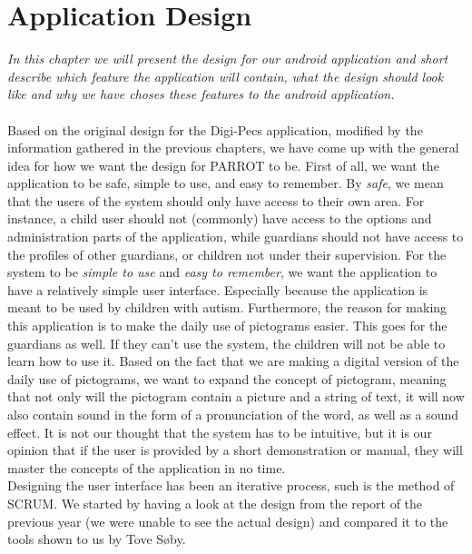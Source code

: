 \chapter{Application Design}
\textit{In this chapter we will present the design for our android application and short describe which feature the application will contain, what the design should look like  and why we have choses these features to the android application.}\\
\label{appdes}
\\
Based on the original design for the Digi-Pecs application, modified by the information gathered in the previous chapters, we have come up with the general idea for how we want the design for PARROT to be.\newline
First of all, we want the application to be safe, simple to use, and easy to remember.\newline
By \textit{safe}, we mean that the users of the system should only have access to their own area. For instance, a child user should not (commonly) have access to the options and administration parts of the application, while guardians should not have access to the profiles of other guardians, or children not under their supervision.\newline
For the system to be \textit{simple to use} and \textit{easy to remember}, we want the application to have a relatively simple user interface. Especially because the application is meant to be used by children with autism. Furthermore, the reason for making this application is to make the daily use of pictograms easier. This goes for the guardians as well. If they can't use the system, the children will not be able to learn how to use it.\newline
Based on the fact that we are making a digital version of the daily use of pictograms, we want to expand the concept of pictogram, meaning that not only will the pictogram contain a picture and a string of text, it will now also contain sound in the form of a pronunciation of the word, as well as a sound effect.
It is not our thought that the system has to be intuitive, but it is our opinion that if the user is provided by a short demonstration or manual, they will master the concepts of the application in no time.\newline
\\
Designing the user interface has been an iterative process, such is the method of SCRUM. We started by having a look at the design from the report of the previous year (we were unable to see the actual design) and compared it to the tools shown to us by Tove S\o{}by.%
